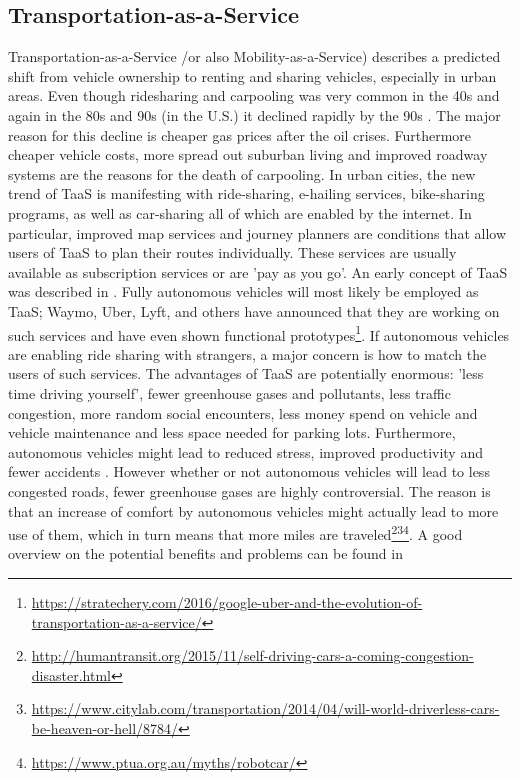 \subsection{Transportation-as-a-Service}\label{ssec:TaaS}
Transportation-as-a-Service /or also Mobility-as-a-Service) describes a predicted shift from vehicle ownership to renting and sharing vehicles, especially in urban areas. Even though ridesharing and carpooling was very common in the 40s and again in the 80s and 90s (in the U.S.) it declined rapidly by the 90s \cite{Ferguson}. The major reason for this decline is cheaper gas prices after the oil crises. Furthermore cheaper vehicle costs, more spread out suburban living and improved roadway systems are the reasons for the death of carpooling. In urban cities, the new trend of TaaS is manifesting with ride-sharing, e-hailing services, bike-sharing programs, as well as car-sharing all of which are enabled by the internet. In particular, improved map services and journey planners are conditions that allow users of TaaS to plan their routes individually. These services are usually available as subscription services or are 'pay as you go'. An early concept of TaaS was described in \cite{Tschanz1996TheServices}. Fully autonomous vehicles will most likely be employed as TaaS; Waymo, Uber, Lyft, and others have announced that they are working on such services and have even shown functional prototypes\footnote{\url{https://stratechery.com/2016/google-uber-and-the-evolution-of-transportation-as-a-service/}}. If autonomous vehicles are enabling ride sharing with strangers, a major concern is how to match the users of such services. The advantages of TaaS are potentially enormous: 'less time driving yourself', fewer greenhouse gases and pollutants, less traffic congestion, more random social encounters, less money spend on vehicle and vehicle maintenance and less space needed for parking lots.
Furthermore, autonomous vehicles might lead to reduced stress, improved productivity and fewer accidents \cite{Fagnant2015PreparingRecommendations}. However whether or not autonomous vehicles will lead to less congested roads, fewer greenhouse gases are highly controversial. The reason is that an increase of comfort by autonomous vehicles might actually lead to more use of them, which in turn means that more miles are traveled\footnote{\url{http://humantransit.org/2015/11/self-driving-cars-a-coming-congestion-disaster.html}}\fnsep\footnote{\url{https://www.citylab.com/transportation/2014/04/will-world-driverless-cars-be-heaven-or-hell/8784/}}\fnsep\footnote{\url{https://www.ptua.org.au/myths/robotcar/}}. A good overview on the potential benefits and problems can be found in \cite{Litman2014AutonomousPlanning} 

